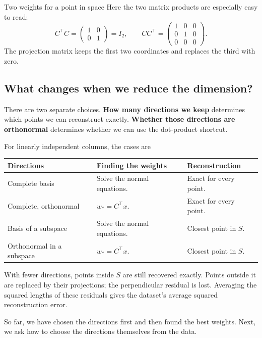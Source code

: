 \documentclass[a4paper,12pt,oneside]{report}
\begin{document}
\begin{framedexample}{Two weights for a point in space}
Here the two matrix products are especially easy to read:
\[
  C^\top C=\begin{pmatrix}1&0\\0&1\end{pmatrix}=I_2,
  \qquad
  CC^\top=\begin{pmatrix}1&0&0\\0&1&0\\0&0&0\end{pmatrix}.
\]
The projection matrix keeps the first two coordinates and replaces
the third with zero.
\end{framedexample}

\subsection{What changes when we reduce the dimension?}

There are two separate choices. \textbf{How many directions we keep}
determines which points we can reconstruct exactly.
\textbf{Whether those directions are orthonormal} determines whether
we can use the dot-product shortcut.

For linearly independent columns, the cases are
\begin{center}
\begin{tabularx}{\linewidth}{@{}lXX@{}}
\toprule
\textbf{Directions} & \textbf{Finding the weights} & \textbf{Reconstruction} \\
\midrule
Complete basis & Solve the normal equations. & Exact for every point. \\
Complete, orthonormal & $w_*=C^\top x$. & Exact for every point. \\
Basis of a subspace & Solve the normal equations. & Closest point in $S$. \\
Orthonormal in a subspace & $w_*=C^\top x$. & Closest point in $S$. \\
\bottomrule
\end{tabularx}
\end{center}

With fewer directions, points inside $S$ are still recovered exactly.
Points outside it are replaced by their projections; the perpendicular
residual is lost. Averaging the squared lengths of these residuals
gives the dataset's average squared reconstruction error.

So far, we have chosen the directions first and then found the best
weights. Next, we ask how to choose the directions themselves from
the data.
\end{document}
